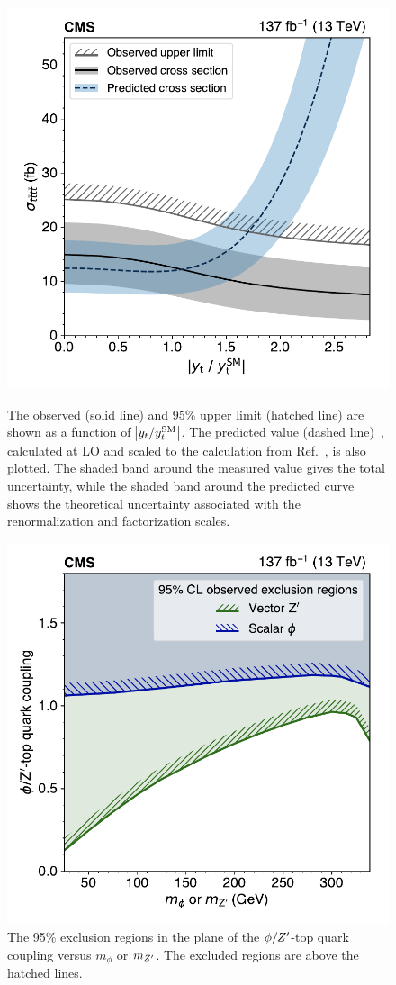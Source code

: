 \begin{figure}[!hbtp]
\centering
\includegraphics[width=.49\textwidth]{figs/ftp/yukawa.pdf}
\\
\caption{
    The observed \xsectttt (solid line) and 95\% \CL upper limit (hatched line) are shown as a function
    of $\abs{y_{t}/y_{t}^{\mathrm{SM}}}$. The predicted value (dashed line)~\cite{THEORY:TopYukawaTTTT},
    calculated at LO and scaled to the calculation from Ref.~\cite{THEORY:Frederix2017wme}, is also plotted.
    The shaded band around the measured value gives the total uncertainty, while the shaded band around
    the predicted curve shows the theoretical uncertainty associated with the renormalization and
    factorization scales.
}
\label{fig:yukawa}
\end{figure}

\begin{figure}[!hbtp]
\centering
    \includegraphics[width=.49\textwidth]{figs/ftp/plot_2d_phizprime.pdf}
\caption{
    The 95\% \CL exclusion regions in the plane of the $\phi/Z^\prime$-top quark coupling versus
    $m_{\phi}$ or $m_{Z^\prime}$. The excluded regions are above the hatched lines.
    }
\label{fig:ZprimePhiExclusions}
\end{figure}

